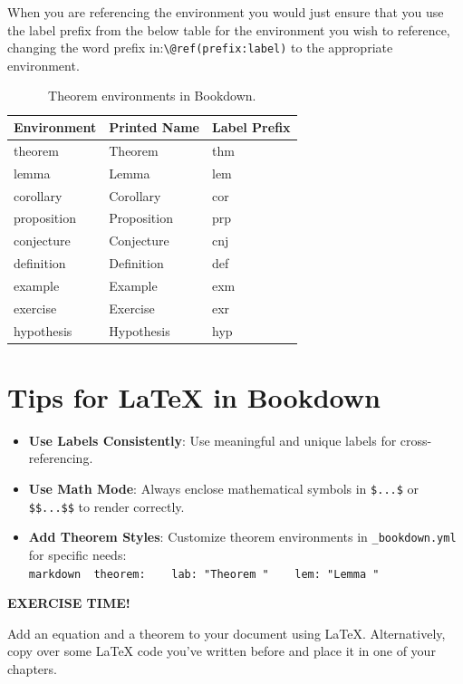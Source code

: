 \documentclass[
]{book}
\providecommand{\tightlist}{%
  \setlength{\itemsep}{0pt}\setlength{\parskip}{0pt}}
\newenvironment{blackbox}{
  \definecolor{shadecolor}{rgb}{0, 0, 0}
  \color{white}
  \begin{shaded}
  }
 {\end{shaded}}
\theoremstyle{definition}
\theoremstyle{definition}
\theoremstyle{definition}
\theoremstyle{definition}
\theoremstyle{remark}
\begin{document}
When you are referencing the environment you would just ensure that you use the label prefix from the below table for the environment you wish to reference, changing the word prefix in:\texttt{\textbackslash{}@ref(prefix:label)} to the appropriate environment.

\begin{table}

\caption{\label{tab:theorem-table}Theorem environments in Bookdown.}
\centering
\begin{tabular}[t]{lll}
\toprule
Environment & Printed Name & Label Prefix\\
\midrule
theorem & Theorem & thm\\
lemma & Lemma & lem\\
corollary & Corollary & cor\\
proposition & Proposition & prp\\
conjecture & Conjecture & cnj\\
\addlinespace
definition & Definition & def\\
example & Example & exm\\
exercise & Exercise & exr\\
hypothesis & Hypothesis & hyp\\
\bottomrule
\end{tabular}
\end{table}

\section{Tips for LaTeX in Bookdown}\label{tips-for-latex-in-bookdown}

\begin{itemize}
\tightlist
\item
  \textbf{Use Labels Consistently}: Use meaningful and unique labels for cross-referencing.
\item
  \textbf{Use Math Mode}: Always enclose mathematical symbols in \texttt{\$...\$} or \texttt{\$\$...\$\$} to render correctly.
\item
  \textbf{Add Theorem Styles}: Customize theorem environments in \texttt{\_bookdown.yml} for specific needs:
  \texttt{markdown\ \ theorem:\ \ \ \ lab:\ "Theorem\ "\ \ \ \ lem:\ "Lemma\ "}
\end{itemize}

\begin{blackbox}

\begin{center}
\textbf{EXERCISE TIME!}

\end{center}

Add an equation and a theorem to your document using LaTeX. Alternatively, copy over some LaTeX code you've written before and place it in one of your chapters.

\end{blackbox}
\end{document}
